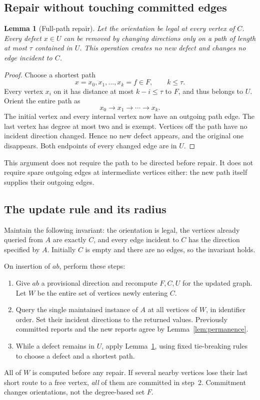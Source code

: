\documentclass[11pt]{article}
\newtheorem{lemma}[theorem]{Lemma}
\theoremstyle{definition}
\begin{document}
\subsection{Repair without touching committed edges}

\begin{lemma}[Full-path repair]\label{lem:path}
Let the orientation be legal at every vertex of $C$. Every defect $x\in U$
can be removed by changing directions only on a path of length at most
$\tau$ contained in $U$. This operation creates no new defect and changes
no edge incident to $C$.
\end{lemma}
\begin{proof}
Choose a shortest path
\[
 x=x_0,x_1,\ldots,x_k=f\in F,\qquad k\le\tau.
\]
Every vertex $x_i$ on it has distance at most $k-i\le\tau$ to $F$, and thus
belongs to $U$. Orient the entire path as
\[
 x_0\longrightarrow x_1\longrightarrow\cdots\longrightarrow x_k.
\]
The initial vertex and every internal vertex now have an outgoing path
edge. The last vertex has degree at most two and is exempt. Vertices off
the path have no incident direction changed. Hence no new defect appears,
and the original one disappears. Both endpoints of every changed edge are
in $U$.
\end{proof}

This argument does not require the path to be directed before repair. It
does not require spare outgoing edges at intermediate vertices either: the
new path itself supplies their outgoing edges.

\subsection{The update rule and its radius}

Maintain the following invariant: the orientation is legal, the vertices
already queried from $A$ are exactly $C$, and every edge incident to $C$
has the direction specified by $A$. Initially $C$ is empty and there are no
edges, so the invariant holds.

On insertion of $ab$, perform these steps:
\begin{enumerate}
\item Give $ab$ a provisional direction and recompute $F,C,U$ for the updated
graph. Let $W$ be the entire set of vertices newly entering $C$.
\item Query the single maintained instance of $A$ at all vertices of $W$,
in identifier order. Set their incident directions to the returned values.
Previously committed reports and the new reports agree by
Lemma~\ref{lem:permanence}.
\item While a defect remains in $U$, apply Lemma~\ref{lem:path}, using fixed
tie-breaking rules to choose a defect and a shortest path.
\end{enumerate}
All of $W$ is computed before any repair. If several nearby vertices lose
their last short route to a free vertex, \emph{all} of them are committed
in step~2. Commitment changes orientations, not the degree-based set $F$.
\end{document}

